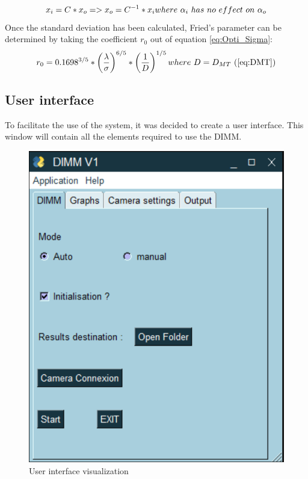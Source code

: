 \begin{equation}
    x_i = C * x_o => x_o = C^{-1} * x_i \\ where\ \alpha_i\ has\ no\ effect\ on\ \alpha_o
\end{equation}
\newline
Once the standard deviation has been calculated, Fried's parameter can be determined by taking the coefficient $r_0$ out of
equation \ref{eq:Opti_Sigma}:
\begin{equation}
    r_0 = 0.1698^{3/5}*\left(\frac{\lambda}{\sigma}\right)^{6/5}*\left(\frac{1}{D}\right)^{1/5} \\ where\ D = D_{MT} \ (\ref{eq:DMT})
\end{equation}
\newpage
\subsection{User interface}
To facilitate the use of the system, it was decided to create a user interface.
This window will contain all the elements required to use the \Gls{DIMM}.
\begin{figure}[H]
    \centering
    \includegraphics[scale=0.85]{assets/figures/Software/GUI1.png}
    \caption{User interface visualization}
    \label{fig:Soft_GUI}
\end{figure}
